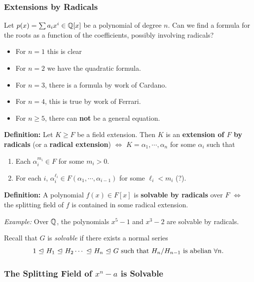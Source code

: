 \hypertarget{extensions-by-radicals}{%
\subsubsection{Extensions by Radicals}\label{extensions-by-radicals}}

Let \(p(x) = \sum a_i x^i \in {\mathbb{Q}}[x]\) be a polynomial of degree \(n\).
Can we find a formula for the roots as a function of the coefficients,
possibly involving radicals?

\begin{itemize}
\item
  For \(n = 1\) this is clear
\item
  For \(n=2\) we have the quadratic formula.
\item
  For \(n = 3\), there is a formula by work of Cardano.
\item
  For \(n = 4\), this is true by work of Ferrari.
\item
  For \(n \geq 5\), there can \textbf{not} be a general equation.
\end{itemize}

\textbf{Definition:} Let \(K \geq F\) be a field extension. Then \(K\)
is an \textbf{extension of \(F\) by radicals} (or a \textbf{radical
extension}) \(\iff\) \(K = \alpha_1, \cdots, \alpha_n\) for some
\(\alpha_i\) such that

\begin{enumerate}
\def\labelenumi{\arabic{enumi}.}
\item
  Each \(\alpha_i^{m_i} \in F\) for some \(m_i > 0\).
\item
  For each \(i\),
  \(\alpha_i^{\ell_i} \in F(\alpha_1, \cdots, \alpha_{i-1})\) for some
  \(\ell_i < m_i\) (?).
\end{enumerate}

\textbf{Definition:} A polynomial \(f(x) \in F[x]\) is \textbf{solvable
by radicals} over \(F\) \(\iff\) the splitting field of \(f\) is
contained in some radical extension.

\emph{Example:} Over \({\mathbb{Q}}\), the polynomials \(x^5-1\) and \(x^3-2\)
are solvable by radicals.

Recall that \(G\) is \emph{solvable} if there exists a normal series \[
1 {~\trianglelefteq~} H_1 {~\trianglelefteq~} H_2 \cdots {~\trianglelefteq~} H_n {~\trianglelefteq~} G
\text{ such that } H_n/H_{n-1} \text{ is abelian } \forall n
.\]

\hypertarget{the-splitting-field-of-xn-a-is-solvable}{%
\subsubsection{\texorpdfstring{The Splitting Field of \(x^n-a\) is
Solvable}{The Splitting Field of x\^{}n-a is Solvable}}\label{the-splitting-field-of-xn-a-is-solvable}}


